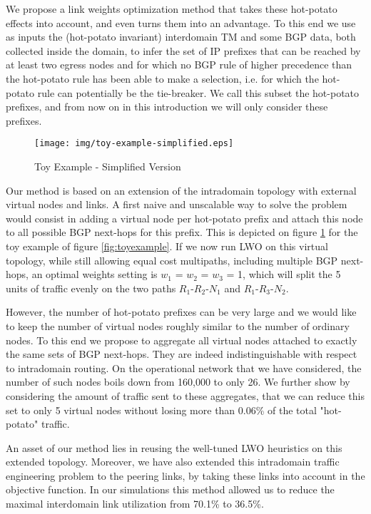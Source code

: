 \documentclass{acm_proc_article-sp}
\begin{document}
We propose a link weights optimization method that takes
these hot-potato effects into account, and even turns them into an
advantage. To this end we use as inputs the (hot-potato invariant)
interdomain TM and some BGP data, both collected inside the domain, to
infer the set of IP prefixes that can be reached by at least two
egress nodes and for which no BGP rule of higher precedence than the
hot-potato rule has been able to make a selection, i.e. for which the
hot-potato rule can potentially be the tie-breaker. We call this
subset the hot-potato prefixes, and from now on in this introduction
we will only consider these prefixes. 

\begin{figure}[htbp]
  \centering
  \texttt{[image: img/toy-example-simplified.eps]}
  \caption{Toy Example - Simplified Version}
  \label{fig:toyexample-simplified}
\end{figure}

Our method is based on an extension of the intradomain topology with
external virtual nodes and links. A first naive and unscalable way to
solve the problem would consist in adding a virtual node per
hot-potato prefix and attach this node to all possible BGP next-hops
for this prefix. This is depicted on figure \ref{fig:toyexample-simplified} for the toy example
of figure \ref{fig:toyexample}. If we now run LWO on this virtual
topology, while still allowing equal cost multipaths, including
multiple BGP next-hops, an optimal weights setting is {$w_1$ = $w_2$ = $w_3$
  = 1}, which will split the 5 units of traffic evenly on the two
paths $R_1$-$R_2$-$N_1$ and $R_1$-$R_3$-$N_2$. 

However, the number of hot-potato prefixes can be very large and we
would like to keep the number of virtual nodes roughly similar to the
number of ordinary nodes. To this end we propose to aggregate all
virtual nodes attached to exactly the same sets of BGP next-hops. They
are indeed indistinguishable with respect to intradomain routing. On
the operational network that we have considered, the number of such
nodes boils down from 160,000 to only 26. We further show by
considering the amount of traffic sent to these aggregates, that we
can reduce this set to only 5 virtual nodes without losing more than
0.06\% of the total "hot-potato" traffic. 

An asset of our method lies in reusing the well-tuned LWO
heuristics on this extended topology. Moreover, we have also extended
this intradomain traffic engineering problem to the
peering links, by taking these links into account in the objective
function. In our simulations this method allowed us to reduce the maximal
interdomain link utilization from 70.1\% to 36.5\%.
\end{document}
